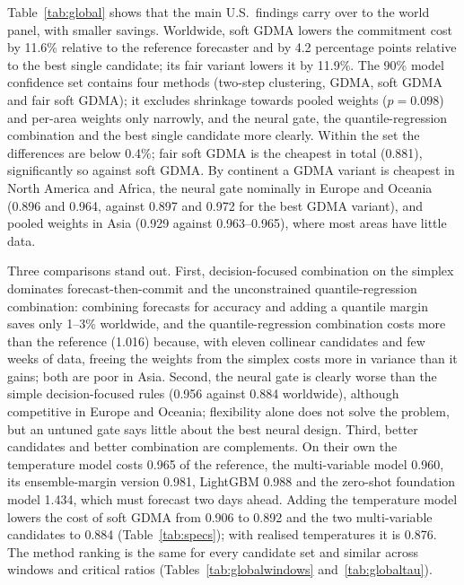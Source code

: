 Table~\ref{tab:global} shows that the main U.S.\ findings carry over to the world panel, with smaller savings.
Worldwide, soft GDMA lowers the commitment cost by 11.6\% relative to the reference forecaster and by 4.2 percentage points relative to the best single candidate; its fair variant lowers it by 11.9\%.
The 90\% model confidence set \citep{Hansen2011mcs} contains four methods (two-step clustering, GDMA, soft GDMA and fair soft GDMA); it excludes shrinkage towards pooled weights ($p=0.098$) and per-area weights only narrowly, and the neural gate, the quantile-regression combination and the best single candidate more clearly.
Within the set the differences are below 0.4\%; fair soft GDMA is the cheapest in total (0.881), significantly so against soft GDMA.
By continent a GDMA variant is cheapest in North America and Africa, the neural gate nominally in Europe and Oceania (0.896 and 0.964, against 0.897 and 0.972 for the best GDMA variant), and pooled weights in Asia (0.929 against 0.963--0.965), where most areas have little data.

Three comparisons stand out.
First, decision-focused combination on the simplex dominates forecast-then-commit and the unconstrained quantile-regression combination: combining forecasts for accuracy and adding a quantile margin saves only 1--3\% worldwide, and the quantile-regression combination costs more than the reference (1.016) because, with eleven collinear candidates and few weeks of data, freeing the weights from the simplex costs more in variance than it gains; both are poor in Asia.
Second, the neural gate is clearly worse than the simple decision-focused rules (0.956 against 0.884 worldwide), although competitive in Europe and Oceania; flexibility alone does not solve the problem, but an untuned gate says little about the best neural design.
Third, better candidates and better combination are complements.
On their own the temperature model costs 0.965 of the reference, the multi-variable model 0.960, its ensemble-margin version 0.981, LightGBM 0.988 and the zero-shot foundation model 1.434, which must forecast two days ahead.
Adding the temperature model lowers the cost of soft GDMA from 0.906 to 0.892 and the two multi-variable candidates to 0.884 (Table~\ref{tab:specs}); with realised temperatures it is 0.876.
The method ranking is the same for every candidate set and similar across windows and critical ratios (Tables~\ref{tab:globalwindows} and~\ref{tab:globaltau}).

\begin{table}[t]
\centering
\caption{World commitment cost relative to the reference forecaster for four candidate sets ($W=28$): eight candidates without weather; nine with the temperature model fed archived GFS forecasts; eleven with, in addition, the multi-variable model and its ensemble-margin version (main specification); and nine with realised temperatures (upper bound). Lower is better: values below 1 mean a lower cost than the benchmark.}\label{tab:specs}
\footnotesize

\end{table}

